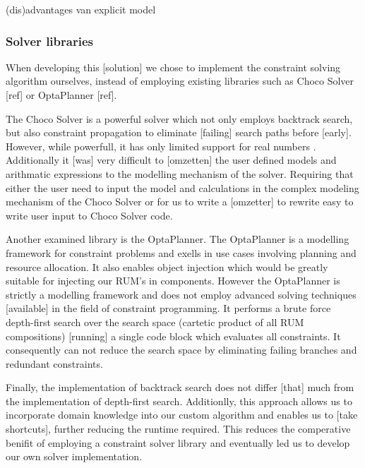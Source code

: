 (dis)advantages van explicit model

\subsubsection{Solver libraries}
When developing this [solution] we chose to implement the constraint solving algorithm ourselves, instead of employing existing libraries such as Choco Solver [ref] or OptaPlanner [ref]. 

The Choco Solver is a powerful solver which not only employs backtrack search, but also constraint propagation to eliminate [failing] search paths before [early]. However, while powerfull, it has only limited support for real numbers \cite{ibex-choco}. Additionally it [was] very difficult to [omzetten] the user defined models and arithmatic expressions to the modelling mechanism of the solver. Requiring that either the user need to input the model and calculations in the complex modeling mechanism of the Choco Solver or for us to write a [omzetter] to rewrite easy to write user input to Choco Solver code.

Another examined library is the OptaPlanner. The OptaPlanner is a modelling framework for constraint problems and exells in use cases involving planning and resource allocation. It also enables object injection which would be greatly suitable for injecting our RUM's in components. However the OptaPlanner is strictly a modelling framework and does not employ advanced solving techniques [available] in the field of constraint programming. It performs a brute force depth-first search over the search space (cartetic product of all RUM compositions) [running] a single code block which evaluates all constraints. It consequently can not reduce the search space by eliminating failing branches and redundant constraints.

Finally, the implementation of backtrack search does not differ [that] much from the implementation of depth-first search. Additionlly, this approach allows us to incorporate domain knowledge into our custom algorithm and enables us to [take shortcuts], further reducing the runtime required. This reduces the comperative benifit of employing a constraint solver library and eventually led us to develop our own solver implementation.


